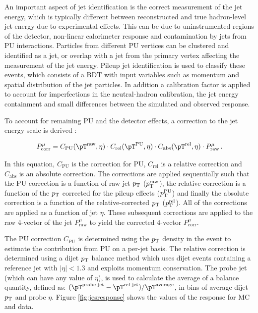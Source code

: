 An important aspect of jet identification is the correct measurement of the jet
energy, which is typically different between reconstructed and true hadron-level jet energy
due to experimental effects. This can be due to uninstrumented regions of the
detector, non-linear calorimeter response and contamination by jets from \ac{PU}
interactions. Particles from different \ac{PU} vertices can be clustered and identified as a
jet, or overlap with a jet from the primary vertex affecting the measurement of the jet energy.
Pileup jet identification \cite{CMS-PAS-JME-13-005} is used to classify these events, which consists
of a \ac{BDT} \cite{TMVA} with input variables such as
momentum and spatial distribution of the jet particles. In addition
a calibration factor is applied to account for imperfections in the
neutral-hadron calibration, the jet energy containment and small differences
between the simulated and observed response.

To account for remaining \ac{PU} and the detector effects, a correction to the jet energy
scale is derived \cite{CMS-JME-10-011}:


\begin{equation}
P_{\text{corr}}^{\mu} = C_{\text{PU}}(\pT^{\text{raw}},\eta) \cdot
C_{\text{rel}}(\pT^{\text{PU}},\eta) \cdot C_{\text{abs}}(\pT^{\text{rel}},\eta) \cdot
P_{\text{raw}}^{\mu}\, .
\end{equation}

In this equation, $C_{\text{PU}}$ is the correction for \ac{PU},
$C_{\text{rel}}$ is a relative correction and $C_{\text{abs}}$ is an absolute
correction. The corrections are applied sequentially such that the \ac{PU}
correction is a function of raw jet $p_{\mathrm{T}}$ ($p_{\mathrm{T}}^{\text{raw}}$),
the relative correction is a function
of the $p_{\mathrm{T}}$ corrected for the pileup effects ($p_{\mathrm{T}}^{\text{PU}}$) and finally
the absolute correction is a function of the relative-corrected $p_{\mathrm{T}}$
($p_{\mathrm{T}}^{\text{rel}}$). All of the corrections are applied as a function of
jet $\eta$. These subsequent corrections are applied to the raw
4-vector of the jet $P_{\text{raw}}^{\mu}$ to yield the corrected 4-vector
$P_{\text{corr}}^{\mu}$.

The \ac{PU} correction $C_{\text{PU}}$ is determined using the $p_{\mathrm{T}}$ density in the event to
estimate the contribution from \ac{PU} on a per-jet basis. The relative
correction is determined using a dijet $p_{\mathrm{T}}$ balance method which uses dijet
events containing a reference jet with $|\eta| < 1.3$ and exploits momentum conservation.
The probe jet (which can have any value of $\eta$), is used to calculate the
average of a balance quantity, defined as:
$(\pT^{\text{probe jet}}-\pT^{\text{ref jet}})/\pT^{\text{average}}$, in bins of
average dijet $p_{\mathrm{T}}$ and probe $\eta$. Figure \ref{fig:jesresponse} shows the
values of the response for \ac{MC} and data. 

